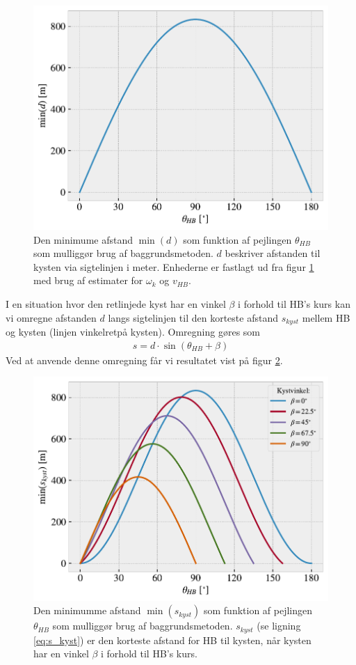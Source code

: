 \documentclass[%
 reprint,
nofootinbib,
aps,
]{revtex4-1}
\begin{document}
\begin{figure}[H]
  \includegraphics[width=\linewidth]{figures/limit_dimension.pdf}
  \caption{Den minimume afstand $\min{(d)}$ som funktion af pejlingen $\theta_{HB}$ som mulliggør brug af baggrundsmetoden. $d$ beskriver afstanden til kysten via sigtelinjen i meter. Enhederne er fastlagt ud fra figur \ref{fig:limit_dimension} med brug af estimater for $\omega_k$ og $v_{HB}$.}
  \label{fig:limit_dimension}
\end{figure}
I en situation hvor den retlinjede kyst har en vinkel $\beta$ i forhold til HB's kurs kan vi omregne afstanden $d$ langs sigtelinjen til den korteste afstand $s_{kyst}$ mellem HB og kysten (linjen vinkelretpå kysten). Omregning gøres som
\begin{align}
  s = d\cdot \sin{(\theta_{HB} + \beta)}
  \label{eq:s_kyst}
\end{align}
Ved at anvende denne omregning får vi resultatet vist på figur \ref{fig:limit_coastdis}.
\begin{figure}[H]
  \includegraphics[width=\linewidth]{figures/limit_coastdis.pdf}
  \caption{Den minimumme afstand $\min{(s_{kyst})}$ som funktion af pejlingen $\theta_{HB}$ som mulliggør brug af baggrundsmetoden. $s_{kyst}$ (se ligning \ref{eq:s_kyst}) er den korteste afstand for HB til kysten, når kysten har en vinkel $\beta$ i forhold til HB's kurs.}
  \label{fig:limit_coastdis}
\end{figure}
\end{document}
